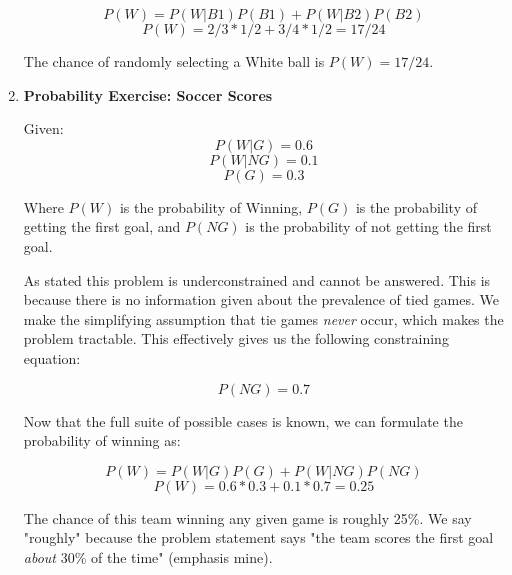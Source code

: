 \documentclass[12pt]{article}
\begin{document}
\begin{enumerate}[leftmargin=\labelsep]
    \[ P(W) = P(W | B1) P(B1) + P(W | B2) P(B2) \]
    \[ P(W) = 2/3 * 1/2 + 3/4 * 1/2 = 17/24 \]

  The chance of randomly selecting a White ball is \(P(W) = 17/24\).

\item \textbf{Probability Exercise: Soccer Scores}

  Given:
    \[ P(W | G) = 0.6 \]
    \[ P(W | NG) = 0.1 \]
    \[ P(G) = 0.3 \]

  Where \(P(W)\) is the probability of Winning, \(P(G)\) is the probability of getting the first goal, and \(P(NG)\) is the probability of not getting the first goal.
  
  As stated this problem is underconstrained and cannot be answered. This is because there is no information given about the prevalence of tied games. We make the simplifying assumption that tie games \emph{never} occur, which makes the problem tractable. This effectively gives us the following constraining equation:

    \[ P(NG) = 0.7 \]

  Now that the full suite of possible cases is known, we can formulate the probability of winning as:

    \[ P(W) = P(W | G) P(G) + P(W | NG) P(NG) \]
    \[ P(W) = 0.6 * 0.3 + 0.1 * 0.7 = 0.25 \]

    The chance of this team winning any given game is roughly 25\%. We say "roughly" because the problem statement says "the team scores the first goal \emph{about} 30\% of the time" (emphasis mine).

\end{enumerate}
\end{document}
